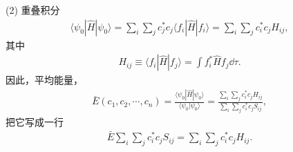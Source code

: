 (2) 重叠积分
\begin{align}
    \langle \psi_0 | \hat H | \psi_0 \rangle = 
    \sum_i \sum_j c_j^* c_j \langle f_i | \hat H | f_i \rangle = \sum_i \sum_j c_i^* c_j H_{ij},
\end{align}
其中
\begin{align}
    H_{ij} \equiv \langle f_i | \hat H | f_j \rangle = \int f_i^* \hat H f_j \dd\tau. 
\end{align}
因此，平均能量，
\begin{align}
    \bar E(c_1, c_2, \cdots, c_n) = \frac{\langle \psi_0 | \hat H | \psi_0 \rangle}{\langle \psi_0 | \psi_0 \rangle} = \frac{\sum_i \sum_j c_i^* c_j H_{ij}}{\sum_i \sum_j c_i^* c_j S_{ij}},
\end{align}
把它写成一行
\begin{align}
    \bar E \sum_i \sum_j c_i^* c_j S_{ij} = \sum_i \sum_j c_i^* c_j H_{ij}. 
\end{align}

